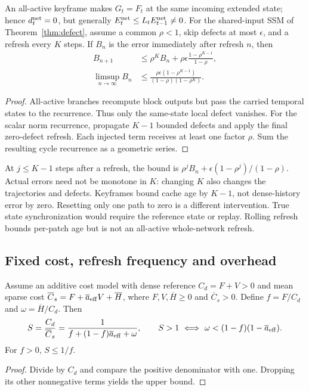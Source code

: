 \begin{Theorem}\label{thm:refresh}
An all-active keyframe makes $G_t=F_t$ at the same incoming extended state;
hence $d_t^{\rm net}=0$, but generally
$E_t^{\rm net}\le L_tE_{t-1}^{\rm net}\ne0$.
For the shared-input SSM of Theorem~\ref{thm:defect}, assume a common
$\rho<1$, skip defects at most $\epsilon$, and a refresh every $K$ steps.
If $B_n$ is the error immediately after refresh $n$, then
\begin{align}
 B_{n+1}&\le\rho^KB_n+\rho\epsilon\frac{1-\rho^{K-1}}{1-\rho},\\
 \limsup_{n\to\infty}B_n&\le
 \frac{\rho\epsilon(1-\rho^{K-1})}{(1-\rho)(1-\rho^K)}.
\end{align}
\end{Theorem}
\begin{proof}
All-active branches recompute block outputs but pass the carried temporal
states to the recurrence. Thus only the same-state local defect vanishes.
For the scalar norm recurrence, propagate $K-1$ bounded defects and apply
the final zero-defect refresh. Each injected term receives at least one
factor $\rho$. Sum the resulting cycle recurrence as a geometric series.
\end{proof}

At $j\le K-1$ steps after a refresh, the bound is
$\rho^jB_n+\epsilon(1-\rho^j)/(1-\rho)$. Actual errors need not be monotone
in $K$: changing $K$ also changes the trajectories and defects. Keyframes
bound cache age by $K-1$, not dense-history error by zero. Resetting only one
path to zero is a different intervention. True state synchronization would
require the reference state or replay. Rolling refresh bounds per-patch age
but is not an all-active whole-network refresh.

\subsection{Fixed cost, refresh frequency and overhead}
\begin{Proposition}\label{prop:cost}
Assume an additive cost model with dense reference $C_d=F+V>0$ and mean
sparse cost $\overline C_s=F+\overline a_{\rm eff}V+\overline H$, where
$F,V,\overline H\ge0$ and $\overline C_s>0$.
Define $f=F/C_d$ and $\omega=\overline H/C_d$.
Then
\begin{equation}
 S=\frac{C_d}{\overline C_s}
 =\frac1{f+(1-f)\overline a_{\rm eff}+\omega},\qquad
 S>1\ \Longleftrightarrow\ \omega<(1-f)(1-\overline a_{\rm eff}).
\end{equation}
For $f>0$, $S\le1/f$.
\end{Proposition}
\begin{proof}
Divide by $C_d$ and compare the positive denominator with one.
Dropping its other nonnegative terms yields the upper bound.
\end{proof}

